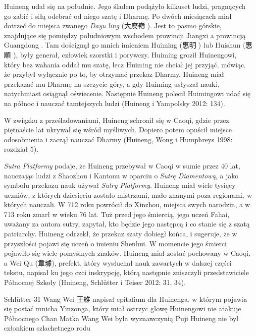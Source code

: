 Huineng udał się na południe. Jego śladem podążyło kilkuset ludzi, pragnących go zabić i siłą odebrać od niego szatę i Dharmę. Po dwóch miesiącach miał dotrzeć do miejsca zwanego \textit{Dayu ling} (大庾嶺 ). Jest to pasmo górskie, znajdujące się pomiędzy południowym wschodem prowincji Jiangxi  a prowincją Guangdong . Tam doścignął go mnich imieniem Huiming (惠明 ) lub Huishun (惠順 ), były generał, człowiek szorstki i porywczy. Huiming groził Huinengowi, który bez wahania oddał mu szatę, lecz Huiming nie chciał jej przyjąć, mówiąc, że przybył wyłącznie po to, by otrzymać przekaz Dharmy. Huineng miał przekazać mu Dharmę na szczycie góry, a gdy Huiming usłyszał nauki, natychmiast osiągnął oświecenie. Następnie Huineng polecił Huimingowi udać się na północ i nauczać tamtejszych ludzi (Huineng i Yampolsky 2012: 134).

W związku z prześladowaniami, Huineng schronił się w Caoqi, gdzie przez piętnaście lat ukrywał się wśród myśliwych. Dopiero potem opuścił miejsce odosobnienia i zaczął nauczać Dharmy (Huineng, Wong i Humphreys 1998: rozdział 5).

\textit{Sutra Platformy} podaje, że Huineng przebywał w Caoqi w sumie przez 40 lat, nauczając ludzi z Shaozhou i Kantonu w oparciu o \textit{Sutrę Diamentową}, a jako symbolu przekazu nauk używał \textit{Sutry Platformy}. Huineng miał wiele tysięcy uczniów, z których dziesięciu zostało mistrzami, mało znanymi poza regionami, w których nauczali. W 712 roku powrócił do Xinzhou, miejsca swych narodzin, a w 713 roku zmarł w wieku 76 lat. Tuż przed jego śmiercią, jego uczeń Fahai, uważany za autora sutry, zapytał, kto będzie jego następcą i co stanie się z szatą patriarchy. Huineng odrzekł, że przekaz szaty dobiegł końca, i sugeruje, że w przyszłości pojawi się uczeń o imieniu Shenhui. W momencie jego śmierci pojawiło się wiele pomyślnych znaków. Huineng miał zostać pochowany w Caoqi, a Wei Qu (韋璩), prefekt, który wysłuchał nauk zawartych w dalszej części tekstu, napisał ku jego czci inskrypcję, którą następnie zniszczyli przedstawiciele Północnej Szkoły (Huineng, Schlütter i Teiser 2012: 31, 34).

Schlütter 31
Wang Wei 王維 napisał epitafium dla Huinenga, w którym pojawia się postać mnicha Yinzonga, który miał ostrzyc głowę Huinengowi
nie atakuje Północnego Chan
Matka Wang Wei była wyznawczynią Puji
Huineng nie był członkiem szlachetnego rodu

